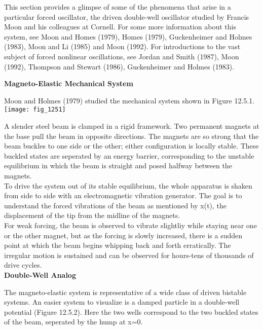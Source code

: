 \documentclass{article}
\newcommand\tab[1][1cm]{\hspace*{#1}}
\begin{document}
This section provides a glimpse of some of the phenomena that arise in a particular forced oscillator, the driven double-well oscillator studied by Francis Moon and his colleagues at Cornell. For some more information about this system, see Moon and Homes (1979), Homes (1979), Guckenheimer and Holmes (1983), Moon and Li (1985) and Moon (1992). For introductions to the vast subject of forced nonlinear oscillations, see Jordan and Smith (1987), Moon (1992), Thompson and Stewart (1986), Guckenheimer and Holmes (1983). \\

\tab 

\textbf {Magneto-Elastic Mechanical System} \\ \tab

Moon and Holmes (1979) studied the mechanical system shown in Figure 12.5.1. \\

\texttt{[image: fig\_1251]} 

A slender steel beam is clamped in a rigid framework. Two permanent magnets at the base pull the beam in opposite directions. The magnets are so strong that the beam buckles to one side or the other; either configuration is locally stable. These buckled states are seperated by an energy barrier, corresponding to the unstable equilibrium in which the beam is straight and posed halfway between the magnets. \\

\tab To drive the system out of its stable equilibrium, the whole apparatus is shaken from side to side with an electromagnetic vibration generator. The goal is to understand the forced vibrations of the beam as mentioned by x(t), the displacement of the tip from the midline of the magnets. \\

\tab For weak forcing, the beam is observed to vibrate slightliy while staying near one or the other magnet, but as the forcing is slowly increased, there is a sudden point at which the beam begins whipping back and forth erratically. The irregular motion is sustained and can be observed for hours-tens of thousands of drive cycles. \\ 
\textbf{Double-Well Analog} \\ \tab

The magneto-elastic system is representative of a wide class of driven bistable systems. An easier system to visualize is a damped particle in a double-well potential (Figure 12.5.2). Here the two wells correspond to the two buckled states of the beam, seperated by the hump at x=0. \\
\end{document}
